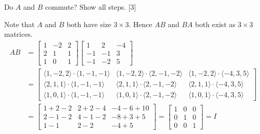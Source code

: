 \documentclass[11pt]{article}
\begin{document}
\begin{enumerate}[label=\alph*)]
Do \(A\) and \(B\) commute? Show all steps. \hfill [3]

\color{blue}
Note that \(A\) and \(B\) both have size \(3\times 3\). Hence \(AB\) and \(BA\) both exist as \(3\times 3\) matrices.
\[ \begin{aligned}
    AB &= \begin{bmatrix}
1 & -2 & 2 \\
2 & 1 & 1 \\
1 & 0 & 1
\end{bmatrix}\begin{bmatrix}
    1 & 2 & -4 \\
    -1 & -1 & 3 \\
    -1 & -2 & 5
\end{bmatrix} \\[1em] 
&= 
\begin{bmatrix}
\langle 1, -2, 2 \rangle \cdot \langle 1,-1,-1 \rangle & \langle 1, -2, 2 \rangle \cdot \langle 2,-1,-2 \rangle & \langle 1, -2, 2 \rangle \cdot \langle -4,3,5 \rangle \\
\langle 2, 1, 1 \rangle \cdot \langle 1,-1,-1 \rangle & \langle 2, 1, 1 \rangle \cdot \langle 2,-1,-2 \rangle & \langle 2, 1, 1 \rangle \cdot \langle -4,3,5 \rangle \\
\langle 1, 0, 1 \rangle \cdot \langle 1,-1,-1 \rangle & \langle 1, 0, 1 \rangle \cdot \langle 2,-1,-2 \rangle & \langle 1, 0, 1 \rangle \cdot \langle -4,3,5 \rangle
\end{bmatrix}\\[1em]
&= \begin{bmatrix}
    1+2-2 & 2+2-4 & -4-6+10\\
    2-1-2 & 4-1-2 & -8+3+5\\
    1-1 & 2-2 & -4+5
\end{bmatrix} = \begin{bmatrix}
1 & 0 & 0 \\
0 & 1 & 0 \\
0 & 0 & 1
\end{bmatrix} = I
\end{aligned}
\]


\end{enumerate}
\end{document}

